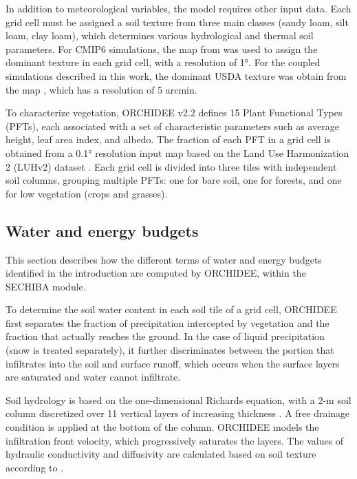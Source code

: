 In addition to meteorological variables, the model requires other input data. Each grid cell must be assigned a soil texture from three main classes (sandy loam, silt loam, clay loam), which determines various hydrological and thermal soil parameters. 
For CMIP6 simulations, the map from \citet{zobler87802world} was used to assign the dominant texture in each grid cell, with a resolution of 1°. For the coupled simulations described in this work, the dominant USDA texture was obtain from the map \citet{reynolds_estimating_2000}, which has a resolution of 5 arcmin.

To characterize vegetation, ORCHIDEE v2.2 defines 15 Plant Functional Types (PFTs), each associated with a set of characteristic parameters such as average height, leaf area index, and albedo. The fraction of each PFT in a grid cell is obtained from a 0.1° resolution input map based on the Land Use Harmonization 2 (LUHv2) dataset \citep{hurtt_harmonization_2020, lurton_implementation_2020}. 
Each grid cell is divided into three tiles with independent soil columns, grouping multiple PFTs: one for bare soil, one for forests, and one for low vegetation (crops and grasses). 


\subsection{Water and energy budgets}

This section describes how the different terms of water and energy budgets identified in the introduction are computed by ORCHIDEE, within the SECHIBA module. 

To determine the soil water content in each soil tile of a grid cell, ORCHIDEE first separates the fraction of precipitation intercepted by vegetation and the fraction that actually reaches the ground. In the case of liquid precipitation (snow is treated separately), it further discriminates between the portion that infiltrates into the soil and surface runoff, which occurs when the surface layers are saturated and water cannot infiltrate.

Soil hydrology is based on the one-dimensional Richards equation, with a 2-m soil column discretized over 11 vertical layers of increasing thickness \citep{de_rosnay_impact_2002, dorgeval_sensitivity_2008}. A free drainage condition is applied at the bottom of the column. ORCHIDEE models the infiltration front velocity, which progressively saturates the layers. The values of hydraulic conductivity and diffusivity are calculated based on soil texture according to \citet{mualem_new_1976, van_genuchten_closed-form_1980}.

